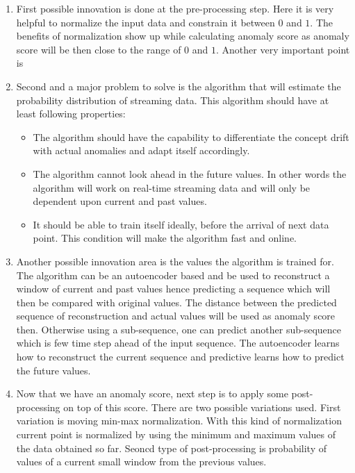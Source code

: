 \documentclass[12pt]{article}
\begin{document}
\begin{enumerate}
    \item First possible innovation is done at the pre-processing step. Here it is very helpful to normalize the input data and constrain it between $0$ and $1$. The benefits of normalization show up while calculating anomaly score as anomaly score will be then close to the range of $0$ and $1$. Another very important point is  
    \item Second and a major problem to solve is the algorithm that will estimate the probability distribution of streaming data. This algorithm should have at least following properties:
    \begin{itemize}
    	\item The algorithm should have the capability to differentiate the concept drift with actual anomalies and adapt itself accordingly.
    	\item The algorithm cannot look ahead in the future values. In other words the algorithm will work on real-time streaming data and will only be dependent upon current and past values.
    	\item It should be able to train itself ideally, before the arrival of next data point. This condition will make the algorithm fast and online.
    \end{itemize}
	\item Another possible innovation area is the values the algorithm is trained for. The algorithm can be an autoencoder based and be used to reconstruct a window of current and past values hence predicting a sequence which will then be compared with original values. The distance between the predicted sequence of reconstruction and actual values will be used as anomaly score then. Otherwise using a sub-sequence, one can predict another sub-sequence which is few time step ahead of the input sequence. The autoencoder learns how to reconstruct the current sequence and predictive learns how to predict the future values. 
	\item Now that we have an anomaly score, next step is to apply some post-processing on top of this score. There are two possible variations used. First variation is moving min-max normalization. With this kind of normalization current point is normalized by using the minimum and maximum values of the data obtained so far. Seoncd type of post-processing is probability of values of a current small window from the previous values.
\end{enumerate}
\newpage
\end{document}
